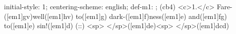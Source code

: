 initial-style: 1;
centering-scheme: english;
def-m1: \grealign;
(cb4) <c>1.</c> Fare-([em1]gv)well([em1]hv) to([em1]g) dark-([em1]f)ness([em1]e) and([em1]fg) to([em1]e) sin!([em1]d) (::) <sp> </sp>([em1]de)<sp> </sp>([em1]dcd)